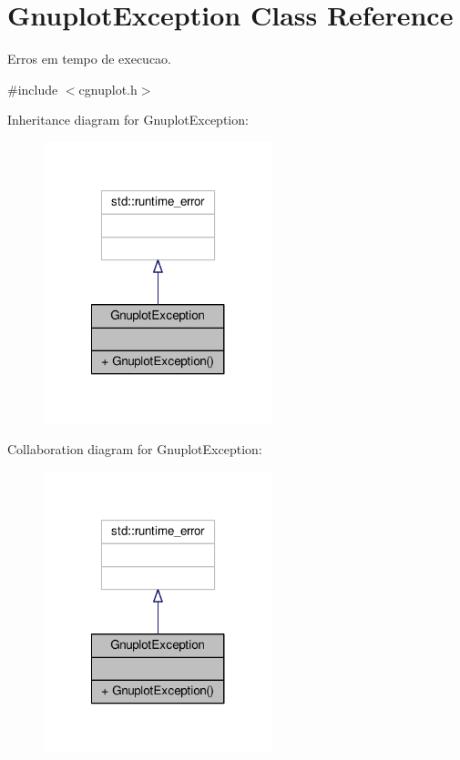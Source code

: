 \hypertarget{classGnuplotException}{\section{Gnuplot\-Exception Class Reference}
\label{classGnuplotException}
}


Erros em tempo de execucao.  




{\ttfamily \#include $<$cgnuplot.\-h$>$}



Inheritance diagram for Gnuplot\-Exception\-:
\nopagebreak
\begin{figure}[H]
\begin{center}
\leavevmode
\includegraphics[width=188pt]{classGnuplotException__inherit__graph}
\end{center}
\end{figure}


Collaboration diagram for Gnuplot\-Exception\-:
\nopagebreak
\begin{figure}[H]
\begin{center}
\leavevmode
\includegraphics[width=188pt]{classGnuplotException__coll__graph}
\end{center}
\end{figure}
